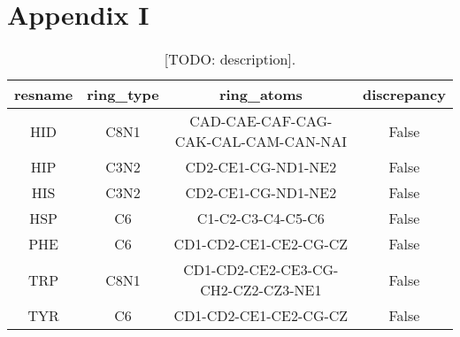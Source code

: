 \chapter*{Appendix I}

\begin{table}[H]
  \caption{\label{tab:appx1/aromatic_prot} [TODO: description].}
  \centering
  \begin{tabular}{cccc}
    \hline
    resname & ring\_type & ring\_atoms                         & discrepancy \\ \hline
    HID     & C8N1       & CAD-CAE-CAF-CAG-CAK-CAL-CAM-CAN-NAI & False       \\
    HIP     & C3N2       & CD2-CE1-CG-ND1-NE2                  & False       \\
    HIS     & C3N2       & CD2-CE1-CG-ND1-NE2                  & False       \\
    HSP     & C6         & C1-C2-C3-C4-C5-C6                   & False       \\
    PHE     & C6         & CD1-CD2-CE1-CE2-CG-CZ               & False       \\
    TRP     & C8N1       & CD1-CD2-CE2-CE3-CG-CH2-CZ2-CZ3-NE1  & False       \\
    TYR     & C6         & CD1-CD2-CE1-CE2-CG-CZ               & False       \\ \hline
  \end{tabular}
\end{table}

